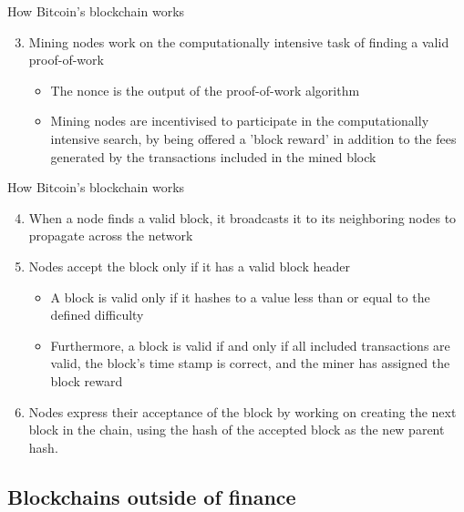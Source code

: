 \documentclass[11pt]{beamer}
\begin{document}

\begin{frame}{How Bitcoin's blockchain works}
	\begin{enumerate}
		\setcounter{enumi}{2}
		\item Mining nodes work on the computationally intensive task of finding a valid proof-of-work
		\begin{itemize}
			\item The nonce is the output of the proof-of-work algorithm
			\item Mining nodes are incentivised to participate in the computationally intensive search, by being offered a 'block reward' in addition to the fees generated by the transactions included in the mined block
		\end{itemize}
	\end{enumerate}
\end{frame}



\begin{frame}{How Bitcoin's blockchain works}
	\begin{enumerate}
		\setcounter{enumi}{3}
		\item When a node finds a valid block, it broadcasts it to its neighboring nodes to propagate across the network
		\item Nodes accept the block only if it has a valid block header
		\begin{itemize}
			\item A block is valid only if it hashes to a value less than or equal to the defined difficulty
			\item Furthermore, a block is valid if and only if all included transactions are valid, the block's time stamp is correct, and the miner has assigned the block reward
		\end{itemize}
		\item Nodes express their acceptance of the block by working on creating the next block in the chain, using the hash of the accepted block as the new parent hash.
	\end{enumerate}
\end{frame}


\subsection{Blockchains outside of finance}
\end{document}
